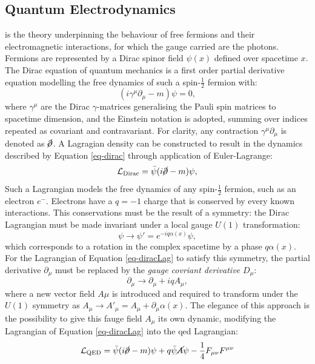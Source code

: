 \subsection{Quantum Electrodynamics}\label{subsec-QED}
 is the theory underpinning the behaviour of free fermions and their electromagnetic interactions, for which the gauge carried are the photons. Fermions are represented by a Dirac spinor field $\psi(x)$ defined over spacetime $x$. The Dirac equation of quantum mechanics is a first order partial derivative equation modelling the free dynamics of such a spin-$\frac{1}{2}$ fermion with:
\begin{equation}\label{eq-dirac}
    (i\gamma^{\mu} \partial_{\mu} - m) \psi = 0,
\end{equation}
where $\gamma^{\mu}$ are the Dirac $\gamma$-matrices generalising the Pauli spin matrices to spacetime dimension, and the Einstein notation is adopted, summing over indices repeated as covariant and contravariant. For clarity, any contraction $\gamma^{\mu} \partial_{\mu}$ is denoted as $\cancel{\partial}$. A Lagragian density can be constructed to result in the dynamics described by Equation \ref{eq-dirac} through application of Euler-Lagrange:
\begin{equation}\label{eq-diracLag}
   \mathcal{L}_{\text{Dirac}} = \bar{\psi} (i \cancel{\partial}- m) \psi,
\end{equation}
Such a Lagrangian models the free dynamics of any spin-$\frac{1}{2}$ fermion, such as an electron $e^-$. Electrons have a $q = -1$ charge that is conserved by every known interactions. This conservations must be the result of a symmetry: the Dirac Lagrangian must be made invariant under a local gauge $U(1)$ transformation:
\begin{equation}\label{eq-GaugeU1}
    \psi \rightarrow \psi' = e^{-iq\alpha(x)} \psi ,
\end{equation}
which corresponds to a rotation in the complex spacetime by a phase $q\alpha(x)$. For the Lagrangian of Equation \ref{eq-diracLag} to satisfy this symmetry, the partial derivative $\partial_{\mu}$ must be replaced by the \textit{gauge covriant derivative $D_{\mu}$}:
\begin{equation}\label{eq-CoDerU1}
    \partial_{\mu} \rightarrow \partial_{\mu} + iqA_{\mu},
\end{equation}
where a new vector field $A\mu$ is introduced and required to transform under the $U(1)$ symmetry as $A_{\mu} \rightarrow A'_{\mu} = A_{\mu} + \partial_{\mu} \alpha(x)$. The elegance of this approach is the possibility to give this fauge field $A_{\mu}$ its own dynamic, modifying the Lagrangian of Equation \ref{eq-diracLag} into the \gls{qed} Lagrangian: \[ \mathcal{L}_{\text{QED}} = \bar{\psi} (i \cancel{\partial}- m) \psi + q \bar{\psi} \cancel{A} \psi - \frac{1}{4} F_{\mu\nu} F^{\mu\nu} \]
